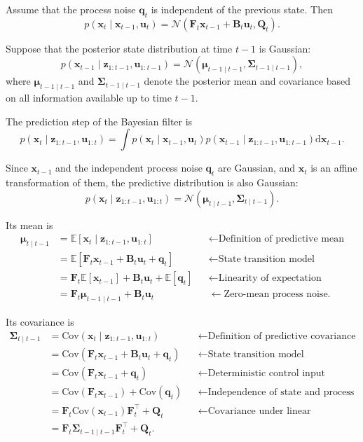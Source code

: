 \documentclass[../Bayesian_Inference.tex]{subfiles}
\begin{document}
Assume that the process noise $\bm{q}_t$ is independent of the previous state. Then
\[
    p(\bm{x}_t\mid\bm{x}_{t-1},\bm{u}_t)=\mathcal{N}\left(\mathbf{F}_t\bm{x}_{t-1} + \mathbf{B}_t\bm{u}_t,\mathbf{Q}_t\right).
\]

Suppose that the posterior state distribution at time $t-1$ is Gaussian:
\[
    p(\bm{x}_{t-1}\mid\bm{z}_{1:t-1},\bm{u}_{1:t-1})=\mathcal{N}\left(\bm{\mu}_{t-1\mid t-1},\mathbf{\Sigma}_{t-1\mid t-1}\right),
\]
where $\bm{\mu}_{t-1\mid t-1}$ and $\mathbf{\Sigma}_{t-1\mid t-1}$ denote the posterior mean and covariance based on all information available up to time $t-1$.

The prediction step of the Bayesian filter is
\[
    p(\bm{x}_t\mid\bm{z}_{1:t-1},\bm{u}_{1:t})=\int p(\bm{x}_t\mid\bm{x}_{t-1},\bm{u}_t)p(\bm{x}_{t-1}\mid\bm{z}_{1:t-1},\bm{u}_{1:t-1})\mathrm{d}\bm{x}_{t-1}.
\]

Since $\bm{x}_{t-1}$ and the independent process noise $\bm{q}_t$ are Gaussian, and $\bm{x}_t$ is an affine transformation of them, the predictive distribution is also Gaussian:
\[
    p(\bm{x}_t\mid\bm{z}_{1:t-1},\bm{u}_{1:t}) = \mathcal{N}\left( \bm{\mu}_{t\mid t-1}, \mathbf{\Sigma}_{t\mid t-1} \right).
\]

Its mean is
\[
\begin{aligned}
    \bm{\mu}_{t\mid t-1}
    &= \mathbb{E}[\bm{x}_t\mid\bm{z}_{1:t-1},\bm{u}_{1:t}] &&\leftarrow \text{Definition of predictive mean} \\
    &= \mathbb{E}[\mathbf{F}_t\bm{x}_{t-1}+\mathbf{B}_t\bm{u}_t+\bm{q}_t] &&\leftarrow \text{State transition model} \\
    &= \mathbf{F}_t\mathbb{E}[\bm{x}_{t-1}] + \mathbf{B}_t\bm{u}_t + \mathbb{E}[\bm{q}_t] &&\leftarrow \text{Linearity of expectation} \\
    &= \mathbf{F}_t\bm{\mu}_{t-1\mid t-1}
    + \mathbf{B}_t\bm{u}_t &&\leftarrow \text{Zero-mean process noise}.
\end{aligned}
\]

Its covariance is
\[
\begin{aligned}
    \mathbf{\Sigma}_{t\mid t-1}
    &= \mathrm{Cov}(\bm{x}_t\mid\bm{z}_{1:t-1},\bm{u}_{1:t}) &&\leftarrow \text{Definition of predictive covariance} \\
    &= \mathrm{Cov}(\mathbf{F}_t\bm{x}_{t-1}+\mathbf{B}_t\bm{u}_t+\bm{q}_t) &&\leftarrow \text{State transition model} \\
    &= \mathrm{Cov}(\mathbf{F}_t\bm{x}_{t-1}+\bm{q}_t) &&\leftarrow \text{Deterministic control input} \\
    &= \mathrm{Cov}(\mathbf{F}_t\bm{x}_{t-1})+\mathrm{Cov}(\bm{q}_t) &&\leftarrow \text{Independence of state and process noise} \\
    &= \mathbf{F}_t\mathrm{Cov}(\bm{x}_{t-1})\mathbf{F}_t^\top+\mathbf{Q}_t &&\leftarrow \text{Covariance under linear transformation} \\
    &= \mathbf{F}_t\mathbf{\Sigma}_{t-1\mid t-1}\mathbf{F}_t^\top+\mathbf{Q}_t.
\end{aligned}
\]
\end{document}
